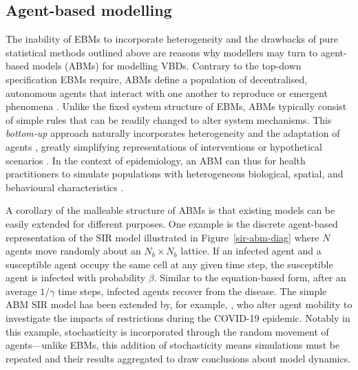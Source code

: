 \subsection{Agent-based modelling}\label{lr-abm}

The inability of EBMs to incorporate heterogeneity and the drawbacks of pure statistical methods outlined above are reasons why modellers may turn to agent-based models (ABMs) for modelling VBDs. Contrary to the top-down specification EBMs require, ABMs define a population of decentralised, autonomous agents that interact with one another to reproduce or  emergent phenomena \cite{epstein_growing_1996}. Unlike the fixed system structure of EBMs, ABMs typically consist of simple rules that can be readily changed to alter system mechanisms. This \textit{bottom-up} approach naturally incorporates heterogeneity and the adaptation of agents \cite{axtell_agent-based_2022}, greatly simplifying representations of interventions or hypothetical scenarios \cite{van_dyke_parunak_agent-based_1998}. In the context of epidemiology, an ABM can thus  for health practitioners to simulate populations with heterogeneous biological, spatial, and behavioural characteristics \cite{marshall_formalizing_2015}.



A corollary of the malleable structure of ABMs is that existing models can be easily extended for different purposes. One example is the discrete agent-based representation of the SIR model illustrated in Figure~\ref{sir-abm-diag} where $N$ agents move randomly about an $N_b\times N_b$ lattice. If an infected agent and a susceptible agent occupy the same cell at any given time step, the susceptible agent is infected with probability $\beta$. Similar to the equation-based form, after an average $1/\gamma$ time steps, infected agents recover from the disease. The simple ABM SIR model has been extended by, for example, \citet{paoluzzi_single-agent_2021}, who alter agent mobility to investigate the impacts of restrictions during the COVID-19 epidemic. Notably in this example, stochasticity is incorporated through the random movement of agents---unlike EBMs, this addition of stochasticity means simulations must be repeated and their results aggregated to draw conclusions about model dynamics.

% 

